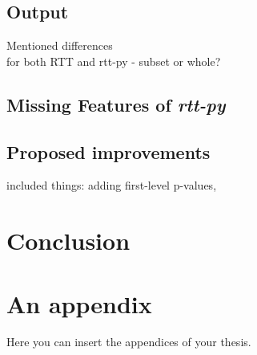 \documentclass[
  digital,     %
  oneside,     %
  nosansbold,  %
  nocolorbold, %
  nolof,         %
  nolot,         %
]{fithesis4}
\begin{document}
\section{Output}
Mentioned differences\\
for both RTT and rtt-py - subset or whole?

\section{Missing Features of \emph{rtt-py}}

\section{Proposed improvements}
included things: adding first-level p-values, 


\chapter{Conclusion}






\appendix %
\chapter{An appendix}
Here you can insert the appendices of your thesis.
\end{document}
